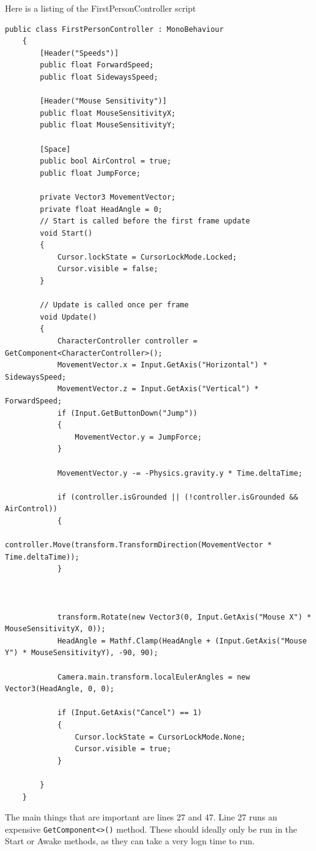 \documentclass{article}
\begin{document}
Here is a listing of the FirstPersonController script
\begin{lstlisting}[language={[Sharp]C}, label={Script}]
    public class FirstPersonController : MonoBehaviour
    {
        [Header("Speeds")]
        public float ForwardSpeed;
        public float SidewaysSpeed;
    
        [Header("Mouse Sensitivity")]
        public float MouseSensitivityX;
        public float MouseSensitivityY;
    
        [Space]
        public bool AirControl = true;
        public float JumpForce;
    
        private Vector3 MovementVector;
        private float HeadAngle = 0;
        // Start is called before the first frame update
        void Start()
        {        
            Cursor.lockState = CursorLockMode.Locked;
            Cursor.visible = false;
        }
    
        // Update is called once per frame
        void Update()
        {
            CharacterController controller = GetComponent<CharacterController>();
            MovementVector.x = Input.GetAxis("Horizontal") * SidewaysSpeed;
            MovementVector.z = Input.GetAxis("Vertical") * ForwardSpeed;
            if (Input.GetButtonDown("Jump"))
            {
                MovementVector.y = JumpForce;
            }
    
            MovementVector.y -= -Physics.gravity.y * Time.deltaTime;
    
            if (controller.isGrounded || (!controller.isGrounded && AirControl))
            {
                controller.Move(transform.TransformDirection(MovementVector * Time.deltaTime));
            }
    
    
    
            transform.Rotate(new Vector3(0, Input.GetAxis("Mouse X") * MouseSensitivityX, 0));
            HeadAngle = Mathf.Clamp(HeadAngle + (Input.GetAxis("Mouse Y") * MouseSensitivityY), -90, 90);
    
            Camera.main.transform.localEulerAngles = new Vector3(HeadAngle, 0, 0);
    
            if (Input.GetAxis("Cancel") == 1)
            {
                Cursor.lockState = CursorLockMode.None;
                Cursor.visible = true;
            }
    
        }
    }
\end{lstlisting}
The main things that are important are lines 27 and 47. Line 27 runs an expensive \lstinline[basicstyle=\footnotesize]{GetComponent<>()} method. These should ideally only be run in the Start or Awake methods, as they can take a very logn time to run.
\end{document}
